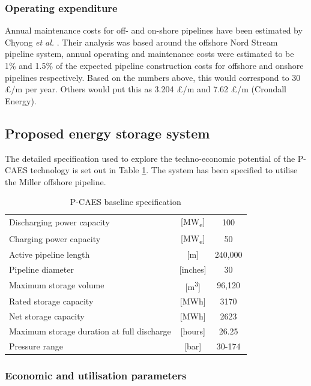 \documentclass[preprint,12pt]{elsarticle}
\begin{document}
\subsubsection{Operating expenditure}

Annual maintenance costs for off- and on-shore pipelines have been estimated by Chyong \textit{et al.} \cite{Chyong}. Their analysis was based around the offshore Nord Stream pipeline system, annual operating and maintenance costs were estimated to be 1\% and 1.5\% of the expected pipeline construction costs for offshore and onshore pipelines respectively. Based on the numbers above, this would correspond to 30 £/m per year. Others would put this as 3.204 £/m \cite {heddle2003economics} and 7.62 £/m (Crondall Energy).

\subsection{Proposed energy storage system}

The detailed specification used to explore the techno-economic potential of the P-CAES technology is set out in Table \ref{tab:technoecononomicspec}. The system has been specified to utilise the Miller offshore pipeline.

\begin{table}[h]
    \centering
    \begin{tabular}{lcc}
\hline
Discharging power capacity & {[}MW\textsubscript{e}{]} & 100  \\
Charging power capacity & {[}MW\textsubscript{e}{]} & 50 \\
Active pipeline length&  {[}m{]} & 240,000  \\
Pipeline diameter & {[}inches{]} & 30  \\
Maximum storage volume & {[}m\textsuperscript{3}{]} & 96,120  \\
Rated storage capacity & {[}MWh{]} & 3170  \\
Net storage capacity & {[}MWh{]} & 2623  \\
Maximum storage duration at full discharge & {[}hours{]} & 26.25  \\
Pressure range & {[}bar{]} & 30-174  \\
\hline
\end{tabular}
    \caption{P-CAES baseline specification}
    \label{tab:technoecononomicspec}
\end{table}

\subsubsection{Economic and utilisation parameters}
\end{document}
